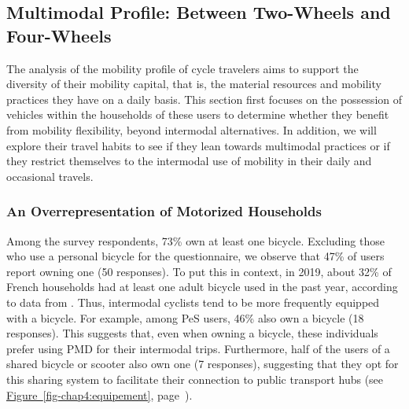 \begin{refsegment}
\subsection{Multimodal Profile: Between Two-Wheels and Four-Wheels
    \label{chap4:capital-mobilite}
    }

The analysis of the mobility profile of cycle travelers aims to support the diversity of their mobility capital, that is, the material resources and mobility practices they have on a daily basis. This section first focuses on the possession of vehicles within the households of these users to determine whether they benefit from mobility flexibility, beyond intermodal alternatives. In addition, we will explore their travel habits to see if they lean towards multimodal practices or if they restrict themselves to the intermodal use of mobility in their daily and occasional travels.%

\subsubsection*{An Overrepresentation of Motorized Households
    \label{chap4:capital-mobilite-equipement}
    }

Among the survey respondents, 73\% own at least one bicycle. Excluding those who use a personal bicycle for the questionnaire, we observe that 47\% of users report owning one (50 responses). To put this in context, in 2019, about 32\% of French households had at least one adult bicycle used in the past year, according to data from \textcolor{blue}{\textcite{commissariat_general_au_developpement_durable_combien_2022}}. Thus, intermodal cyclists tend to be more frequently equipped with a bicycle. For example, among \acrshort{PeS} users, 46\% also own a bicycle (18 responses). This suggests that, even when owning a bicycle, these individuals prefer using \acrshort{PMD} for their intermodal trips. Furthermore, half of the users of a shared bicycle or scooter also own one (7 responses), suggesting that they opt for this sharing system to facilitate their connection to public transport hubs (see \hyperref[fig-chap4:equipement]{Figure~\ref{fig-chap4:equipement}}, page~\pageref{fig-chap4:equipement}).%


\end{refsegment}
